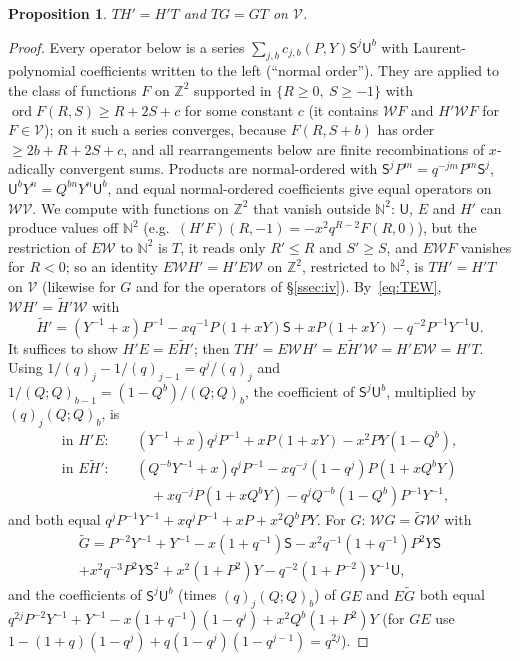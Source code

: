 \documentclass[11pt]{amsart}
\newtheorem{proposition}[theorem]{Proposition}
\theoremstyle{definition}
\numberwithin{equation}{section}
\newcommand{\Z}{\mathbb{Z}}
\newcommand{\N}{\mathbb{N}}
\begin{document}
\begin{proposition}\label{prop:comm}
$TH'=H'T$ and $TG=GT$ on $\mathcal V$.
\end{proposition}
\begin{proof}
Every operator below is a series $\sum_{j,b}c_{j,b}(P,Y)\mathsf S^j\mathsf U^b$ with Laurent-polynomial coefficients
written to the left (``normal order''). They are applied to the class of functions $F$ on $\Z^2$ supported in
$\{R\ge0,\ S\ge-1\}$ with $\operatorname{ord}F(R,S)\ge R+2S+c$ for some constant $c$ (it contains $\mathcal WF$ and $H'\mathcal WF$
for $F\in\mathcal V$); on it such a series converges, because $F(R,S+b)$ has order $\ge2b+R+2S+c$, and all
rearrangements below are finite recombinations of $x$-adically convergent sums. Products are normal-ordered with
$\mathsf S^jP^m=q^{-jm}P^m\mathsf S^j$, $\mathsf U^bY^n=Q^{bn}Y^n\mathsf U^b$, and equal normal-ordered coefficients give
equal operators on $\mathcal W\mathcal V$. We compute with functions on $\Z^2$ that vanish outside $\N^2$:
$\mathsf U$, $E$ and $H'$ can produce values off $\N^2$ (e.g.\ $(H'F)(R,-1)=-x^2q^{R-2}F(R,0)$), but the restriction
of $E\mathcal W$ to $\N^2$ is $T$, it reads only $R'\le R$ and $S'\ge S$, and $E\mathcal WF$ vanishes for $R<0$; so
an identity $E\mathcal WH'=H'E\mathcal W$ on $\Z^2$, restricted to $\N^2$, is $TH'=H'T$ on $\mathcal V$ (likewise for
$G$ and for the operators of §\ref{ssec:iv}).
By~\eqref{eq:TEW}, $\mathcal WH'=\tilde H'\mathcal W$ with
\[
\tilde H'=(Y^{-1}+x)P^{-1}-xq^{-1}P(1+xY)\mathsf S+xP(1+xY)-q^{-2}P^{-1}Y^{-1}\mathsf U .
\]
It suffices to show $H'E=E\tilde H'$; then $TH'=E\mathcal WH'=E\tilde H'\mathcal W=H'E\mathcal W=H'T$. Using
$1/(q)_j-1/(q)_{j-1}=q^j/(q)_j$ and $1/(Q;Q)_{b-1}=(1-Q^b)/(Q;Q)_b$, the coefficient of $\mathsf S^j\mathsf U^b$,
multiplied by $(q)_j(Q;Q)_b$, is
\begin{align*}
\text{in }H'E:&\quad (Y^{-1}+x)q^jP^{-1}+xP(1+xY)-x^2PY(1-Q^b),\\
\text{in }E\tilde H':&\quad (Q^{-b}Y^{-1}+x)q^jP^{-1}-xq^{-j}(1-q^j)P(1+xQ^bY)\\
&\qquad+xq^{-j}P(1+xQ^bY)-q^jQ^{-b}(1-Q^b)P^{-1}Y^{-1},
\end{align*}
and both equal $q^jP^{-1}Y^{-1}+xq^jP^{-1}+xP+x^2Q^bPY$. For $G$: $\mathcal WG=\tilde G\mathcal W$ with
\begin{multline*}
\tilde G=P^{-2}Y^{-1}+Y^{-1}-x(1+q^{-1})\mathsf S-x^2q^{-1}(1+q^{-1})P^2Y\mathsf S\\
+x^2q^{-3}P^2Y\mathsf S^2+x^2(1+P^2)Y-q^{-2}(1+P^{-2})Y^{-1}\mathsf U,
\end{multline*}
and the coefficients of $\mathsf S^j\mathsf U^b$ (times $(q)_j(Q;Q)_b$) of $GE$ and $E\tilde G$ both equal
$q^{2j}P^{-2}Y^{-1}+Y^{-1}-x(1+q^{-1})(1-q^j)+x^2Q^b(1+P^2)Y$ (for $GE$ use
$1-(1+q)(1-q^j)+q(1-q^j)(1-q^{j-1})=q^{2j}$).
\end{proof}
\end{document}
